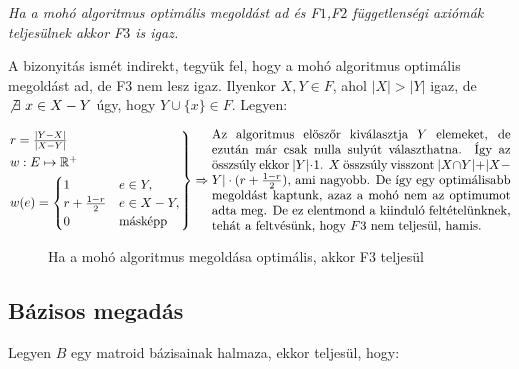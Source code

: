 \vspace{0.4cm}
\emph{Ha a mohó algoritmus optimális megoldást ad és F$1$,F$2$ függetlenségi axiómák
teljesülnek akkor F$3$ is igaz.}
\vspace{0.4cm}

A bizonyitás ismét indirekt, tegyük fel, hogy a mohó algoritmus optimális megoldást ad, de
F$3$ nem lesz igaz. Ilyenkor $X,Y \in F$, ahol $|X|>|Y|$ igaz, de $\not \exists~x \in X-Y$ úgy, hogy
$Y \cup \{x\} \in F$. Legyen:

\[
\begin{rcases}
r=\frac{|Y-X|}{|X-Y|}\\
w : E \mapsto \mathbb{R}^+ \\
w(e) = \begin{cases}
1 & e \in Y, \\
r + \frac{1-r}{2} & e \in X-Y, \\
0 & \mbox{másképp}
\end{cases}
\end{rcases}\Rightarrow
\parbox[L]{8.25cm}{
Az algoritmus elöszőr kiválasztja $Y$ elemeket, de ezután már csak nulla sulyút
választhatna. Így az összsúly ekkor $|Y|\cdot 1$. $X$ összsúly visszont $|X \cap
Y| + |X-Y|\cdot(r+\frac{1-r}{2})$, ami nagyobb. De így egy optimálisabb megoldást
kaptunk, azaz a mohó nem az optimumot adta meg. De ez elentmond a kiinduló feltételünknek,
tehát a feltvésünk, hogy $F$3 nem teljesül, hamis. } \]

\begin{figure}[htbp]
\centering
{}
\caption{Ha a mohó algoritmus megoldása optimális, akkor F3 teljesül}\label{fig:Mohó}
\end{figure}

\subsection{Bázisos megadás}
Legyen $B$ egy matroid bázisainak halmaza, ekkor teljesül, hogy:


